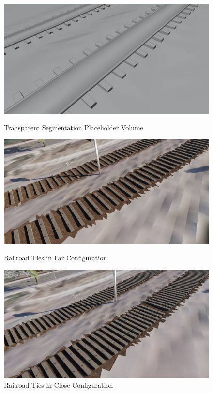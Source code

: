 \begin{figure}[!htb]
   \begin{minipage}{0.3\textwidth}
     \centering
     \includegraphics[width=.97\linewidth]{src/img/procedural-tracks/3c-matte-view.jpg}
     \caption{Transparent Segmentation Placeholder Volume}
     \label{fig:track-transparent-segmentation-placeholder}
   \end{minipage}\hfill
   \begin{minipage}{0.3\textwidth}
     \centering
     \includegraphics[width=\linewidth]{src/img/procedural-tracks/2b-planks-far.jpg}
     \caption{Railroad Ties in Far Configuration}
     \label{fig:wood-far}
   \end{minipage}\hfill
   \begin{minipage}{0.3\textwidth}
     \centering
     \includegraphics[width=.97\linewidth]{src/img/procedural-tracks/2a-planks-bolts-close.jpg}
     \caption{Railroad Ties in Close Configuration}
     \label{fig:wood-close}
   \end{minipage}
\end{figure}



